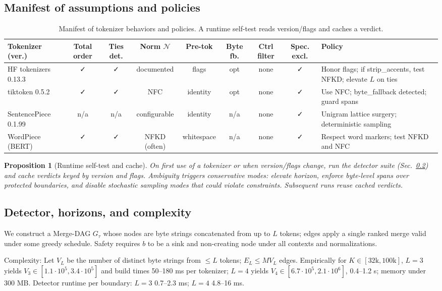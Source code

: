 \documentclass{article}
\newtheorem{proposition}{Proposition}
\begin{document}
\subsection{Manifest of assumptions and policies}\label{sec:manifest}
\begin{table}[H]
\centering
\small
\begin{tabular}{@{}lcccccccl@{}}
\toprule
Tokenizer (ver.) & Total order & Ties det. & Norm $\mathcal{N}$ & Pre-tok & Byte fb. & Ctrl filter & Spec. excl. & Policy \\
\midrule
HF tokenizers 0.13.3 & ✓ & ✓ & documented & flags & opt & none & ✓ & Honor flags; if strip\_accents, test NFKD; elevate $L$ on ties \\
tiktoken 0.5.2 & ✓ & ✓ & NFC & identity & opt & none & ✓ & Use NFC; byte\_fallback detected; guard spans \\
SentencePiece 0.1.99 & n/a & n/a & configurable & identity & n/a & none & ✓ & Unigram lattice surgery; deterministic sampling \\
WordPiece (BERT) & ✓ & ✓ & NFKD (often) & whitespace & n/a & none & ✓ & Respect word markers; test NFKD and NFC \\
\bottomrule
\end{tabular}
\caption{Manifest of tokenizer behaviors and policies. A runtime self-test reads version/flags and caches a verdict.}
\label{tab:manifest}
\end{table}

\begin{proposition}[Runtime self-test and cache]
On first use of a tokenizer or when version/flags change, run the detector suite (Sec.~\ref{sec:detector}) and cache verdicts keyed by version and flags. Ambiguity triggers conservative modes: elevate horizon, enforce byte-level spans over protected boundaries, and disable stochastic sampling modes that could violate constraints. Subsequent runs reuse cached verdicts.
\end{proposition}

\subsection{Detector, horizons, and complexity}\label{sec:detector}
We construct a Merge-DAG $G_\tau$ whose nodes are byte strings concatenated from up to $L$ tokens; edges apply a single ranked merge valid under some greedy schedule. Safety requires $b$ to be a sink and non-creating node under all contexts and normalizations.

Complexity: Let $V_L$ be the number of distinct byte strings from $\le L$ tokens; $E_L\le M V_L$ edges. Empirically for $K\in[32\mathrm{k},100\mathrm{k}]$, $L=3$ yields $V_3\in[1.1\cdot10^5,3.4\cdot10^5]$ and build times 50–180 ms per tokenizer; $L=4$ yields $V_4\in[6.7\cdot10^5,2.1\cdot10^6]$, 0.4–1.2 s; memory under 300 MB. Detector runtime per boundary: $L=3$ 0.7–2.3 ms; $L=4$ 4.8–16 ms.
\end{document}
